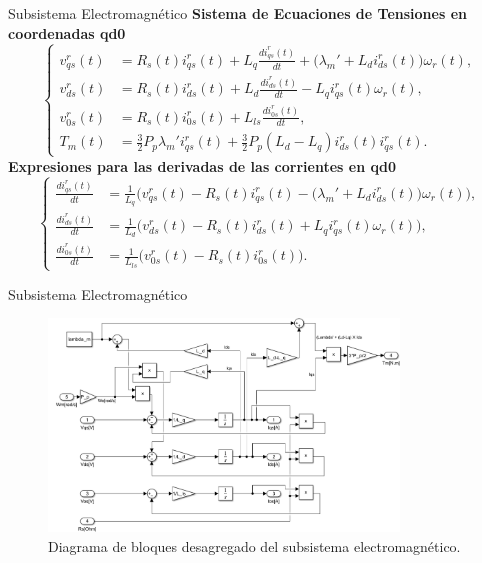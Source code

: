 \documentclass[12pt]{beamer}
\begin{document}
\begin{frame}{Subsistema Electromagnético}\footnotesize
    \textbf{Sistema de Ecuaciones de Tensiones en coordenadas qd0}
    \begin{equation}
    \left\{
    \begin{aligned}
        v_{qs}^r(t) &= R_s(t) i_{qs}^r(t) + L_q \frac{d i_{qs}^r(t)}{dt} + \big(\lambda_m' + L_d i_{ds}^r(t)\big) \omega_r(t), \\
        v_{ds}^r(t) &= R_s(t) i_{ds}^r(t) + L_d \frac{d i_{ds}^r(t)}{dt} - L_q i_{qs}^r(t) \omega_r(t), \\
        v_{0s}^r(t) &= R_s(t) i_{0s}^r(t) + L_{ls} \frac{d i_{0s}^r(t)}{dt}, \\
        T_m(t) &= \frac{3}{2} P_p \lambda_m' i_{qs}^r(t) + \frac{3}{2} P_p (L_d - L_q) i_{ds}^r(t) i_{qs}^r(t).
    \end{aligned}
    \right.
    \label{eq:SubsistemaElectromagnetico}
    \end{equation}
    \textbf{Expresiones para las derivadas de las corrientes en qd0}
    \begin{equation}
    \left\{
    \begin{aligned}
        \frac{d i_{qs}^r(t)}{dt} &= \frac{1}{L_q} \Big( v_{qs}^r(t) - R_s(t) i_{qs}^r(t) - \big(\lambda_m' + L_d i_{ds}^r(t)\big) \omega_r(t) \Big), \\
        \frac{d i_{ds}^r(t)}{dt} &= \frac{1}{L_d} \Big( v_{ds}^r(t) - R_s(t) i_{ds}^r(t) + L_q i_{qs}^r(t) \omega_r(t) \Big), \\
        \frac{d i_{0s}^r(t)}{dt} &= \frac{1}{L_{ls}} \Big( v_{0s}^r(t) - R_s(t) i_{0s}^r(t) \Big).
    \end{aligned}
    \right.
    \end{equation}
\end{frame}

\begin{frame}{Subsistema Electromagnético}\footnotesize
    \begin{figure}[h]
        \centering
        \includegraphics[width=0.83\textwidth]{Imagenes/BloquesSistElectromagnetico.png}
        \caption{Diagrama de bloques desagregado del subsistema electromagnético.}
    \end{figure}
\end{frame}
\end{document}
